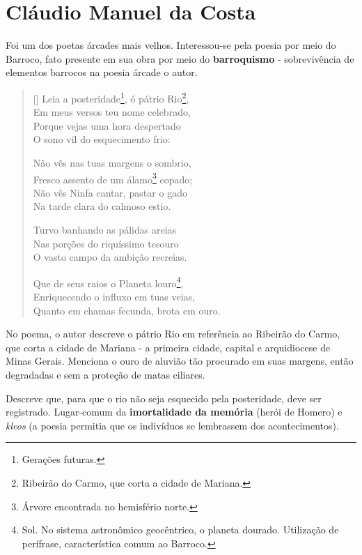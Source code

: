 \documentclass[12pt]{book}
\begin{document}
			\section{Cláudio Manuel da Costa}
			\par Foi um dos poetas árcades mais velhos. Interessou-se pela poesia por meio do Barroco, fato presente em sua obra por meio do \textbf{barroquismo} - sobrevivência de elementos barrocos na poesia árcade o autor.
			\settowidth{\versewidth}{Em meus versos teu nome celebrado,}
			\begin{verse}[\versewidth]
				Leia a posteridade\footnote{Gerações futuras.}, ó pátrio Rio\footnote{Ribeirão do Carmo, que corta a cidade de Mariana.}, \\
				Em meus versos teu nome celebrado, \\
				Porque vejas uma hora despertado \\
				O sono vil do esquecimento frio:
				
				Não vês nas tuas margens o sombrio, \\
				Fresco assento de um álamo\footnote{Árvore encontrada no hemisfério norte.} copado; \\
				Não vês Ninfa cantar, pastar o gado \\
				Na tarde clara do calmoso estio.
				
				Turvo banhando as pálidas areias \\
				Nas porções do riquíssimo tesouro \\
				O vasto campo da ambição recreias.
				
				Que de seus raios o Planeta louro\footnote{Sol. No sistema astronômico geocêntrico, o planeta dourado. Utilização de perífrase, característica comum ao Barroco.}, \\
				Enriquecendo o influxo em tuas veias, \\
				Quanto em chamas fecunda, brota em ouro.
			\end{verse}
			\par No poema, o autor descreve o pátrio Rio em referência ao Ribeirão do Carmo, que corta a cidade de Mariana - a primeira cidade, capital e arquidiocese de Minas Gerais. Menciona o ouro de aluvião tão procurado em suas margens, então degradadas e sem a proteção de matas ciliares.
			\par Descreve que, para que o rio não seja esquecido pela posteridade, deve ser registrado. Lugar-comum da \textbf{imortalidade da memória} (herói de Homero) e \textit{kleos} (a poesia permitia que os indivíduos se lembrassem dos acontecimentos).
\end{document}
